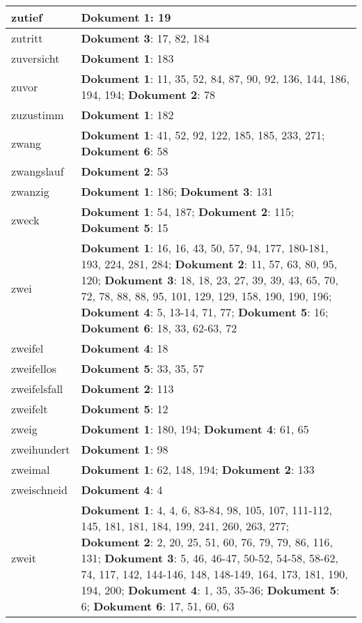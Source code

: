 \documentclass[a5paper]{article}
\begin{document}
\begin{longtable}[l]{|l|p{3in}|}
\hline
zutief & \textbf{Dokument 1}: 19 \\
\hline
zutritt & \textbf{Dokument 3}: 17, 82, 184 \\
\hline
zuversicht & \textbf{Dokument 1}: 183 \\
\hline
zuvor & \textbf{Dokument 1}: 11, 35, 52, 84, 87, 90, 92, 136, 144, 186, 194, 194; \textbf{Dokument 2}: 78 \\
\hline
zuzustimm & \textbf{Dokument 1}: 182 \\
\hline
zwang & \textbf{Dokument 1}: 41, 52, 92, 122, 185, 185, 233, 271; \textbf{Dokument 6}: 58 \\
\hline
zwangslauf & \textbf{Dokument 2}: 53 \\
\hline
zwanzig & \textbf{Dokument 1}: 186; \textbf{Dokument 3}: 131 \\
\hline
zweck & \textbf{Dokument 1}: 54, 187; \textbf{Dokument 2}: 115; \textbf{Dokument 5}: 15 \\
\hline
zwei & \textbf{Dokument 1}: 16, 16, 43, 50, 57, 94, 177, 180-181, 193, 224, 281, 284; \textbf{Dokument 2}: 11, 57, 63, 80, 95, 120; \textbf{Dokument 3}: 18, 18, 23, 27, 39, 39, 43, 65, 70, 72, 78, 88, 88, 95, 101, 129, 129, 158, 190, 190, 196; \textbf{Dokument 4}: 5, 13-14, 71, 77; \textbf{Dokument 5}: 16; \textbf{Dokument 6}: 18, 33, 62-63, 72 \\
\hline
zweifel & \textbf{Dokument 4}: 18 \\
\hline
zweifellos & \textbf{Dokument 5}: 33, 35, 57 \\
\hline
zweifelsfall & \textbf{Dokument 2}: 113 \\
\hline
zweifelt & \textbf{Dokument 5}: 12 \\
\hline
zweig & \textbf{Dokument 1}: 180, 194; \textbf{Dokument 4}: 61, 65 \\
\hline
zweihundert & \textbf{Dokument 1}: 98 \\
\hline
zweimal & \textbf{Dokument 1}: 62, 148, 194; \textbf{Dokument 2}: 133 \\
\hline
zweischneid & \textbf{Dokument 4}: 4 \\
\hline
zweit & \textbf{Dokument 1}: 4, 4, 6, 83-84, 98, 105, 107, 111-112, 145, 181, 181, 184, 199, 241, 260, 263, 277; \textbf{Dokument 2}: 2, 20, 25, 51, 60, 76, 79, 79, 86, 116, 131; \textbf{Dokument 3}: 5, 46, 46-47, 50-52, 54-58, 58-62, 74, 117, 142, 144-146, 148, 148-149, 164, 173, 181, 190, 194, 200; \textbf{Dokument 4}: 1, 35, 35-36; \textbf{Dokument 5}: 6; \textbf{Dokument 6}: 17, 51, 60, 63 \\
\hline

\end{longtable}
\end{document}
